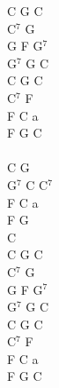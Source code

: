 \documentclass[a5paper, 10pt]{book}
\begin{document}
\begin{minipage}[t]{0.2\textwidth}
C G C\\
C$^7$ G\\
G F G$^7$\\
G$^7$ G C\\
C G C\\
C$^7$ F\\
F C a\\
F G C\\
\\
C G\\
G$^7$ C C$^7$\\
F C a\\
F G\\
C\\

C G C\\
C$^7$ G\\
G F G$^7$\\
G$^7$ G C\\
C G C\\
C$^7$ F\\
F C a\\
F G C\\
\end{minipage}

\newpage
\end{document}

